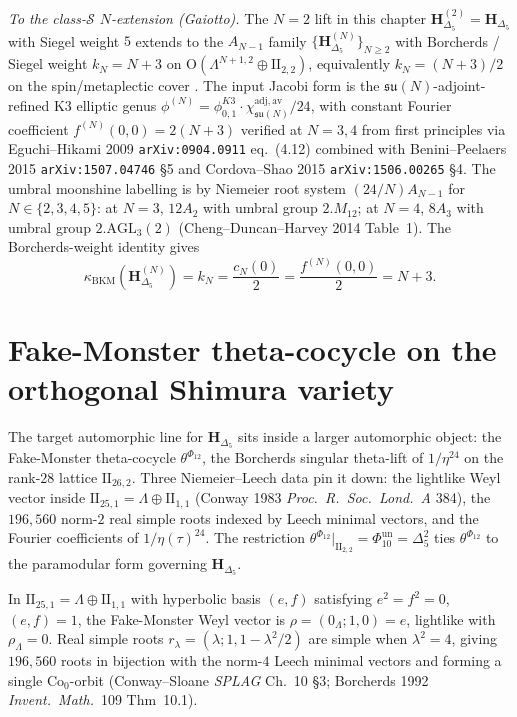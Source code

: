 \emph{To the class-$\mathcal S$ $N$-extension (Gaiotto).}
The $N = 2$ lift in this chapter
$\mathbf{H}^{(2)}_{\Delta_5} = \mathbf{H}_{\Delta_5}$ with Siegel
weight $5$ extends to the $A_{N-1}$ family
$\{\mathbf{H}^{(N)}_{\Delta_5}\}_{N \ge 2}$ with Borcherds / Siegel
weight $k_N = N + 3$ on
$\mathrm O(\Lambda^{N+1,2} \oplus \mathrm{II}_{2,2})$, equivalently
$k_N = (N+3)/2$ on the spin/metaplectic cover
\cite{VolI,VolII}. The input Jacobi form
is the $\mathfrak{su}(N)$-adjoint-refined K3 elliptic genus
$\phi^{(N)} = \phi_{0,1}^{K3} \cdot \chi^{\mathrm{adj, av}}_{\mathfrak{su}(N)}/24$,
with constant Fourier coefficient $f^{(N)}(0, 0) = 2(N+3)$
verified at $N = 3, 4$ from first principles via
Eguchi--Hikami 2009 \texttt{arXiv:0904.0911} eq.~(4.12) combined
with Benini--Peelaers 2015 \texttt{arXiv:1507.04746} \S 5 and
Cordova--Shao 2015 \texttt{arXiv:1506.00265} \S 4. The umbral
moonshine labelling is by Niemeier root system $(24/N) A_{N-1}$
for $N \in \{2, 3, 4, 5\}$: at $N = 3$, $12 A_2$ with umbral group
$2.M_{12}$; at $N = 4$, $8 A_3$ with umbral group
$2.\mathrm{AGL}_3(2)$ (Cheng--Duncan--Harvey 2014 Table~1).
The Borcherds-weight identity gives
\[
  \kappa_{\mathrm{BKM}}\!\left(\mathbf{H}^{(N)}_{\Delta_5}\right)
  = k_N
  = \frac{c_N(0)}{2}
  = \frac{f^{(N)}(0,0)}{2}
  = N+3 .
\]

\section{Fake-Monster theta-cocycle on the orthogonal Shimura variety}
\label{sec:fake-monster-theta-cocycle}

The target automorphic line for $\mathbf{H}_{\Delta_5}$ sits inside a
larger automorphic object: the Fake-Monster theta-cocycle
$\theta^{\Phi_{12}}$, the Borcherds
singular theta-lift of $1/\eta^{24}$ on the rank-$28$ lattice
$\mathrm{II}_{26,2}$. Three Niemeier--Leech data pin it down: the lightlike
Weyl vector inside $\mathrm{II}_{25,1} = \Lambda\oplus\mathrm{II}_{1,1}$
(Conway 1983 \emph{Proc.~R.~Soc.~Lond.~A} 384), the $196{,}560$ norm-$2$
real simple roots indexed by Leech minimal vectors, and the Fourier
coefficients of $1/\eta(\tau)^{24}$. The restriction
\(\theta^{\Phi_{12}}|_{\mathrm{II}_{2,2}}=\Phi_{10}^{\mathrm{un}}=\Delta_5^2\) ties
$\theta^{\Phi_{12}}$ to the paramodular form governing $\mathbf{H}_{\Delta_5}$.

\begin{proposition}
\label{prop:fake-monster-weyl-vector}
In $\mathrm{II}_{25,1} = \Lambda\oplus\mathrm{II}_{1,1}$ with hyperbolic
basis $(e,f)$ satisfying $e^2 = f^2 = 0$, $(e,f) = 1$, the Fake-Monster Weyl
vector is $\rho = (0_\Lambda; 1, 0) = e$, lightlike with $\rho_\Lambda = 0$.
Real simple roots $r_\lambda = (\lambda; 1, 1-\lambda^2/2)$ are simple when
$\lambda^2 = 4$, giving $196{,}560$ roots in bijection with the norm-$4$
Leech minimal vectors and forming a single $\mathrm{Co}_0$-orbit
(Conway--Sloane \emph{SPLAG} Ch.~10 \S 3; Borcherds 1992
\emph{Invent.~Math.}~109 Thm~10.1).
\end{proposition}

